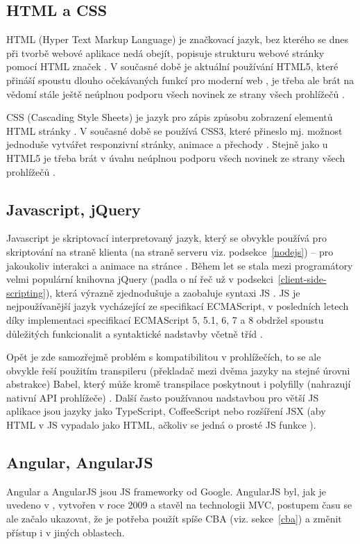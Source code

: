         \subsection{HTML a CSS}
        HTML (Hyper Text Markup Language) je značkovací jazyk, bez kterého se dnes při tvorbě webové aplikace nedá obejít, popisuje strukturu webové stránky pomocí HTML značek \cite{html1}. V současné době je aktuální používání HTML5, které přináší spoustu dlouho očekávaných funkcí pro moderní web \cite{html2}, je třeba ale brát na vědomí stále ještě neúplnou podporu všech novinek ze strany všech prohlížečů \cite{html3}.
        
        CSS (Cascading Style Sheets) je jazyk pro zápis způsobu zobrazení elementů HTML stránky \cite{css2}. V současné době se používá CSS3, které přineslo mj. možnost jednoduše vytvářet responzivní stránky, animace a přechody \cite{css3}. Stejně jako u HTML5 je třeba brát v úvahu neúplnou podporu všech novinek ze strany všech prohlížečů \cite{css1}.
        
        \subsection{Javascript, jQuery}\label{js}
        Javascript je skriptovací interpretovaný jazyk, který se obvykle používá pro skriptování na straně klienta (na straně serveru viz. podsekce~\ref{nodejs}) -- pro jakoukoliv interakci a animace na stránce \cite{js2}. Během let se stala mezi programátory velmi populární knihovna jQuery (padla o ní řeč už v podsekci~\ref{client-side-scripting}), která výrazně zjednodušuje a zaobaluje syntaxi JS \cite{scripting-upwork}. JS je nejpoužívanější jazyk vycházející ze specifikací ECMAScript, v posledních letech díky implementaci specifikací ECMAScript 5, 5.1, 6, 7 a 8 obdržel spoustu důležitých funkcionalit a syntaktické nadstavby včetně tříd \cite{js3}.
        
        Opět je zde samozřejmě problém s kompatibilitou v prohlížečích, to se ale obvykle řeší použitím transpileru (překladač mezi dvěma jazyky na stejné úrovni abstrakce) Babel, který může kromě transpilace poskytnout i polyfilly (nahrazují nativní API prohlížeče) \cite{js4,js1}. Další často používanou nadstavbou pro větší JS aplikace jsou jazyky jako TypeScript, CoffeeScript \cite{js5} nebo rozšíření JSX \cite{js6} (aby HTML v JS vypadalo jako HTML, ačkoliv se jedná o prosté JS funkce \cite{js-fw3}).
        
        \subsection{Angular, AngularJS}\label{sec:angular}
        Angular a AngularJS jsou JS frameworky od Google. AngularJS byl, jak je uvedeno v \cite{angular1}, vytvořen v roce 2009 a stavěl na technologii MVC, postupem času se ale začalo ukazovat, že je potřeba použít spíše CBA (viz. sekce~\ref{cba}) a změnit přístup i v jiných oblastech. 
        
